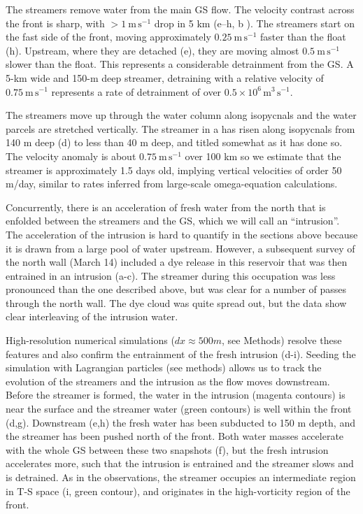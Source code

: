 \documentclass{natureJMK}
\begin{document}
The streamers remove water from the main GS flow.  The velocity contrast across the front is  sharp, with $>1\ \mathrm{m\,s^{-1}}$ drop in 5 km (e--h, b ).  The streamers start on the fast side of the front, moving approximately $0.25\ \mathrm{m\,s^{-1}}$ faster than the float (h). Upstream, where they are detached (e), they are moving almost $0.5\ \mathrm{m\,s^{-1}}$ slower than the float.  This represents a considerable detrainment from the GS.  A 5-km wide and 150-m deep streamer, detraining with a relative velocity of $0.75\ \mathrm{m\,s^{-1}}$ represents a rate of detrainment of over $0.5\times10^{6}\, \mathrm{m^{3}\,s^{-1}}$.  

The streamers move up through the water column along isopycnals and the water parcels are stretched vertically. The streamer in a has risen along isopycnals from 140 m deep (d)  to less than 40 m deep, and titled somewhat as it has done so.   The velocity anomaly is about $0.75\ \mathrm{m\,s^{-1}}$ over 100 km so we estimate that the streamer is approximately 1.5 days old,  implying vertical velocities of order  50 m/day, similar to rates inferred from large-scale omega-equation calculations\cite{thomasjoyce10}.  

Concurrently, there is an acceleration of fresh water from the north that is enfolded between the streamers and the GS, which we will call an ``intrusion''. The acceleration of the intrusion is hard to quantify in the sections above because it is drawn from a large pool of water upstream.  However, a subsequent survey of the north wall (March 14) included a dye release in this reservoir that was then entrained in an intrusion (a-c). The streamer during this occupation was less pronounced than the one described above, but was clear for a number of passes through the north wall.  The dye cloud was quite spread out, but the data show clear interleaving of the intrusion water.  

High-resolution numerical simulations ($dx\approx 500 m$, see Methods) resolve these features and also confirm the entrainment of the fresh intrusion (d-i). Seeding the simulation with Lagrangian particles (see methods) allows us to track the evolution of the streamers and the intrusion as the flow moves downstream.  Before the streamer is formed, the water in the intrusion (magenta contours) is near the surface and the streamer water (green contours) is well within the front (d,g).  Downstream (e,h) the fresh water has been subducted to 150 m depth, and the streamer has been pushed north of the front.  Both water masses accelerate with the whole GS between these two snapshots (f), but the fresh intrusion accelerates more, such that the intrusion is entrained and the streamer slows and is detrained.  As in the observations, the streamer occupies an intermediate region in T-S space (i, green contour), and originates in the high-vorticity region of the front.   
\end{document}
